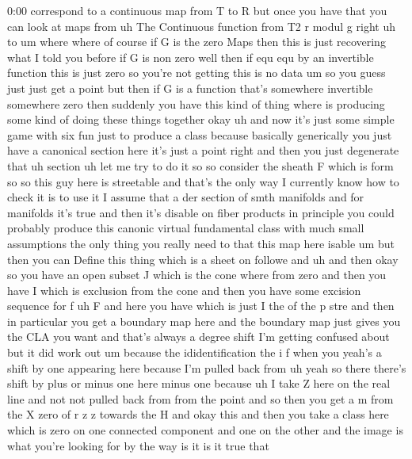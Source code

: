 \begin{unfinished}{0:00}
correspond  to  a  continuous  map  from  T  to
R
but  once  you  have  that  you  can  look  at
maps
from  uh  The  Continuous  function  from  T2
r  modul  g  right  uh
to
um  where  where  of  course  if  G  is  the
zero  Maps  then  this  is  just  recovering
what  I  told  you  before  if  G  is  non  zero
well  then  if  equ  equ  by  an  invertible
function  this  is  just  zero  so  you're  not
getting  this  is  no  data  um  so  you  guess
just  just  get  a  point  but  then  if  G  is  a
function  that's  somewhere  invertible
somewhere  zero  then  suddenly  you  have
this  kind  of  thing  where  is  producing
some  kind  of  doing  these  things  together
okay
uh
and  now  it's  just  some  simple  game  with
six  fun  just  to  produce  a  class  because
basically  generically  you  just  have  a
canonical  section  here  it's  just  a  point
right  and  then  you  just  degenerate  that
uh
section  uh  let  me  try  to  do  it
so  so  consider  the
sheath  F  which  is
form  so  so  this  guy  here  is
streetable  and  that's  the  only  way  I
currently  know  how  to  check  it  is  to  use
it  I  assume  that  a  der  section  of  smth
manifolds  and  for  manifolds  it's  true
and  then  it's  disable  on  fiber
products  in  principle  you  could  probably
produce  this  canonic  virtual  fundamental
class  with  much  small  assumptions  the
only  thing  you  really  need  to  that  this
map  here  isable
um  but  then  you  can  Define  this  thing
which  is  a  sheet
on
followe
and
uh  and  then  okay  so  you  have  an  open
subset  J  which  is  the
cone  where  from  zero  and  then  you  have  I
which  is  exclusion  from  the
cone  and  then  you  have  some  excision
sequence  for  f
uh
F  and  here  you
have  which  is  just  I  the  of  the  p
stre
and  then  in  particular  you  get  a
boundary  map  here  and  the  boundary  map
just  gives  you  the  CLA  you
want
and  that's  always  a  degree  shift  I'm
getting  confused  about  but  it  did  work
out
um  because  the  ididentification  the  i  f
when
you
yeah's  a  shift  by  one  appearing  here
because  I'm  pulled  back
from  uh  yeah  so  there  there's  shift  by
plus  or  minus  one
here  minus  one  because  uh  I  take  Z  here
on  the  real  line  and  not  not  pulled  back
from  from  the
point  and  so  then  you  get  a  m  from  the  X
zero  of  r  z
z  towards  the
H  and  okay  this  and  then  you  take  a
class  here  which  is  zero  on  one
connected  component  and  one  on  the  other
and  the  image  is  what  you're  looking
for  by  the  way  is  it  is  it  true  that

\end{unfinished}
